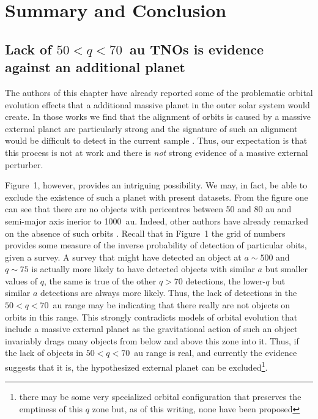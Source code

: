 \documentclass[preprint]{aastex62}
\begin{document}
\section{Summary and Conclusion} 

\subsection{Lack of $50<q<70$~au TNOs is evidence against an additional planet}

The authors of this chapter have already reported some of the problematic orbital evolution effects that a additional massive planet in the outer solar system would create.  In  those works we find that the alignment of orbits is caused by a massive external planet are particularly strong \citep{shankman17}  and the signature of such an alignment would be difficult to detect in the current sample \citep{lawler2017}.  Thus, our expectation is that this process is not at work and there is {\em not} strong evidence of a massive external perturber.

Figure~1, however, provides an intriguing possibility.  We may, in fact, be able to exclude the existence of such a planet with present datasets. From the figure one can see that there are no objects with pericentres between 50 and 80 au and semi-major axis inerior to 1000~au.  Indeed, other authors have already remarked on the absence of such orbits \citep[e.g.][]{sheppard18,bannister17}.  Recall that in Figure~1 the grid of numbers provides some measure of the inverse probability of detection of particular obits, given a survey.  A survey that might have detected an object at $a \sim 500$ and $q \sim75$ is actually more likely to have detected objects with similar $a$ but smaller values of $q$, the same is true of the other $q>70$ detections, the lower-$q$ but similar $a$ detections are always more likely.  Thus, the lack of detections in the $50 < q < 70$~au range may be indicating that there really are not objects on orbits in this range.  This strongly contradicts models of orbital evolution that include a massive external planet as the gravitational action of such an object invariably drags many objects from below and above this zone into it.  Thus, if the lack of objects in $50 < q < 70$~au range is real, and currently the evidence suggests that it is, the hypothesized external planet can be excluded\footnote{there may be some very specialized orbital configuration that preserves the emptiness of this  $q$ zone but, as of this writing, none have been proposed}.
\end{document}
